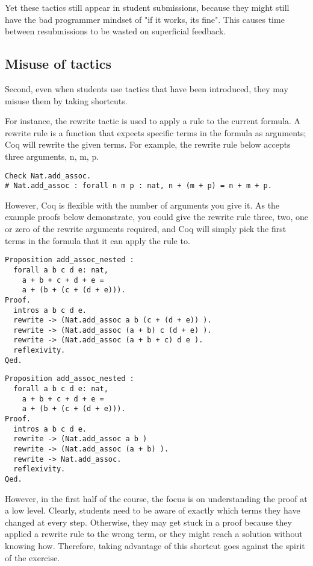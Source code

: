 Yet these tactics still appear in student submissions, because they might still have the bad programmer mindset of "if it works, its fine". This causes time between resubmissions to be wasted on superficial feedback. 

\subsection{ Misuse of tactics }
Second, even when students use tactics that have been introduced, they may misuse them by taking shortcuts.

For instance, the rewrite tactic is used to apply a rule to the current formula. A rewrite rule is a function that expects specific terms in the formula as arguments; Coq will rewrite the given terms. For example, the rewrite rule below accepts three arguments, n, m, p.

\begin{verbatim}
Check Nat.add_assoc.
# Nat.add_assoc : forall n m p : nat, n + (m + p) = n + m + p. 
\end{verbatim}

However, Coq is flexible with the number of arguments you give it. As the example proofs below demonstrate, you could give the rewrite rule three, two, one or zero of the rewrite arguments required, and Coq will simply pick the first terms in the formula that it can apply the rule to. 
\begin{verbatim}
Proposition add_assoc_nested :
  forall a b c d e: nat,
    a + b + c + d + e = 
    a + (b + (c + (d + e))).
Proof.
  intros a b c d e.
  rewrite -> (Nat.add_assoc a b (c + (d + e)) ).
  rewrite -> (Nat.add_assoc (a + b) c (d + e) ).
  rewrite -> (Nat.add_assoc (a + b + c) d e ).
  reflexivity.
Qed.
\end{verbatim}
\begin{verbatim}
Proposition add_assoc_nested :
  forall a b c d e: nat,
    a + b + c + d + e = 
    a + (b + (c + (d + e))).
Proof.
  intros a b c d e.
  rewrite -> (Nat.add_assoc a b )
  rewrite -> (Nat.add_assoc (a + b) ).
  rewrite -> Nat.add_assoc.
  reflexivity.
Qed.
\end{verbatim}
However, in the first half of the course, the focus is on understanding the proof at a low level. Clearly, students need to be aware of exactly which terms they have changed at every step. Otherwise, they may get stuck in a proof because they applied a rewrite rule to the wrong term, or they might reach a solution without knowing how. Therefore, taking advantage of this shortcut goes against the spirit of the exercise. 

